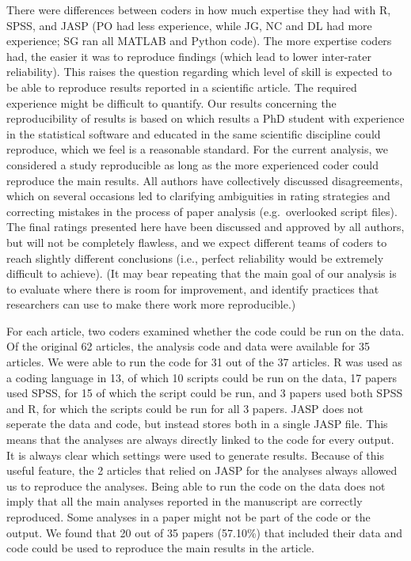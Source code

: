 \documentclass[,jou, a4paper,floatsintext]{apa6}
\begin{document}
There were differences between coders in how much expertise they had with R, SPSS, and JASP (PO had less experience, while JG, NC and DL had more experience; SG ran all MATLAB and Python code). The more expertise coders had, the easier it was to reproduce findings (which lead to lower inter-rater reliability). This raises the question regarding which level of skill is expected to be able to reproduce results reported in a scientific article. The required experience might be difficult to quantify. Our results concerning the reproducibility of results is based on which results a PhD student with experience in the statistical software and educated in the same scientific discipline could reproduce, which we feel is a reasonable standard. For the current analysis, we considered a study reproducible as long as the more experienced coder could reproduce the main results. All authors have collectively discussed disagreements, which on several occasions led to clarifying ambiguities in rating strategies and correcting mistakes in the process of paper analysis (e.g.~overlooked script files). The final ratings presented here have been discussed and approved by all authors, but will not be completely flawless, and we expect different teams of coders to reach slightly different conclusions (i.e., perfect reliability would be extremely difficult to achieve). (It may bear repeating that the main goal of our analysis is to evaluate where there is room for improvement, and identify practices that researchers can use to make there work more reproducible.)

For each article, two coders examined whether the code could be run on the data. Of the original 62 articles, the analysis code and data were available for 35 articles. We were able to run the code for 31 out of the 37 articles. R was used as a coding language in 13, of which 10 scripts could be run on the data, 17 papers used SPSS, for 15 of which the script could be run, and 3 papers used both SPSS and R, for which the scripts could be run for all 3 papers. JASP does not seperate the data and code, but instead stores both in a single JASP file. This means that the analyses are always directly linked to the code for every output. It is always clear which settings were used to generate results. Because of this useful feature, the 2 articles that relied on JASP for the analyses always allowed us to reproduce the analyses. Being able to run the code on the data does not imply that all the main analyses reported in the manuscript are correctly reproduced. Some analyses in a paper might not be part of the code or the output. We found that 20 out of 35 papers (57.10\%) that included their data and code could be used to reproduce the main results in the article.
\end{document}
